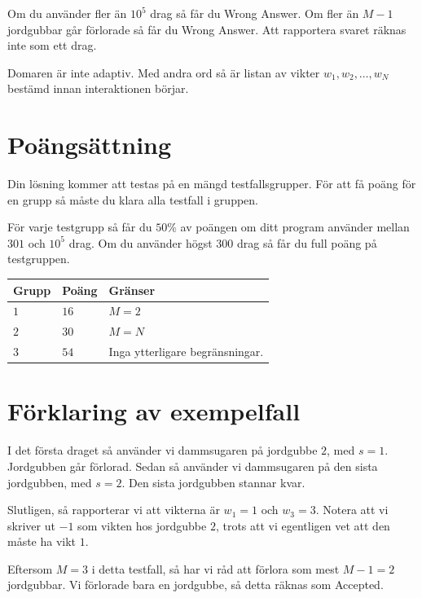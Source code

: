 Om du använder fler än $10^5$ drag så får du Wrong Answer. Om fler än $M-1$ jordgubbar går förlorade så får du Wrong Answer. 
Att rapportera svaret räknas inte som ett drag.

Domaren är inte adaptiv. Med andra ord så är listan av vikter $w_1, w_2, \dots, w_N$ bestämd innan interaktionen börjar.

\section*{Poängsättning}
Din lösning kommer att testas på en mängd testfallsgrupper.
För att få poäng för en grupp så måste du klara alla testfall i gruppen.

För varje testgrupp så får du $50\%$ av poängen om ditt program använder mellan $301$ och $10^5$ drag. Om du använder 
högst $300$ drag så får du full poäng på testgruppen.

\noindent
\begin{tabular}{| l | l | p{12cm} |}
  \hline
  \textbf{Grupp} & \textbf{Poäng} & \textbf{Gränser} \\ \hline
  $1$      & $16$      & $M = 2$  \\ \hline
  $2$      & $30$      & $M = N$ \\ \hline
  $3$      & $54$      & Inga ytterligare begränsningar. \\ \hline
\end{tabular}



\section*{Förklaring av exempelfall}

I det första draget så använder vi dammsugaren på jordgubbe $2$, med $s = 1$. Jordgubben går förlorad. Sedan så använder 
vi dammsugaren på den sista jordgubben, med $s = 2$. Den sista jordgubben stannar kvar.

Slutligen, så rapporterar vi att vikterna är $w_1 = 1$ och $w_3 = 3$. Notera att vi skriver ut $-1$ som vikten hos jordgubbe $2$, 
trots att vi egentligen vet att den måste ha vikt $1$.

Eftersom $M = 3$ i detta testfall, så har vi råd att förlora som mest $M-1 = 2$ jordgubbar. Vi förlorade bara en jordgubbe, så 
detta räknas som Accepted.

